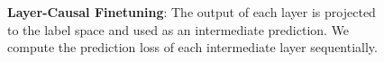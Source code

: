 \begin{figure}[h]%
	\centering
	\caption{\textbf{Layer-Causal Finetuning}: The output of each layer is projected to the label space and used as an intermediate prediction.
		We compute the prediction loss of each intermediate layer sequentially.
	}
	\label{fig:layer_causal_diagram}
\end{figure}
